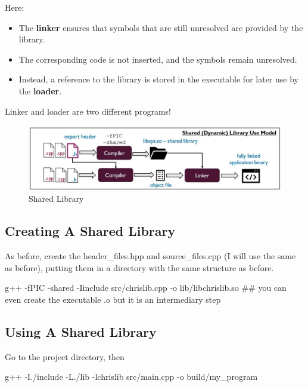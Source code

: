 Here:
\begin{itemize}
    \item The \textbf{linker} ensures that symbols that are still unresolved are provided by the library. 
    \item The corresponding code is not inserted, and the symbols remain unresolved.
    \item Instead, a reference to the library is stored in the executable for later use by the \textbf{loader}.
\end{itemize}

\begin{warningblock}
    Linker and loader are two different programs!
\end{warningblock}

\begin{figure}[H]
    \centering
    \includegraphics[width=\textwidth]{assets/dynamic_lib.jpeg}
    \caption{Shared Library}
\end{figure}

\subsection*{Creating A Shared Library}

As before, create the header\_files.hpp and source\_files.cpp (I will use the same as before), putting them in a directory with the same structure as before. 
\begin{codeblock}[language=bash]
g++ -fPIC -shared -Iinclude src/chrislib.cpp -o lib/libchrislib.so  ## you can even create the executable .o but it is an intermediary step
\end{codeblock}

\subsection*{Using A Shared Library}


Go to the project directory, then
\begin{codeblock}[language=bash]
g++ -I./include -L./lib -lchrislib src/main.cpp -o build/my_program  
\end{codeblock}

